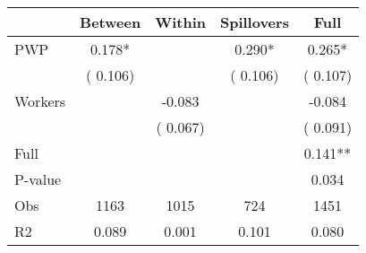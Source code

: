 
\begin{tabular}{l*{4}{c}}\hline&\multicolumn{1}{c}{Between}&\multicolumn{1}{c}{Within}&\multicolumn{1}{c}{Spillovers}&\multicolumn{1}{c}{Full}\\ \hline
 PWP           &              0.178*      &                                               &        0.290* &         0.265*                            \\ 
                               &        (       0.106)           &                                       &       (       0.106)     &      (       0.107)                                           \\ 
 Workers       &                                               &       -0.083    &                                &            -0.084                            \\ 
                               &                                               & (       0.067)                  &                                        &      (       0.091)                                           \\ 
\hline                                                                                                                                                                                                                                            
 Full                  &                                               &                                               &                                        &             0.141**                                     \\ 
 P-value               &                                               &                                               &                                        &             0.034                                           \\ 
 Obs                   &               1163               &       1015                       &       724                &              1451                                               \\ 
 R2                    &                      0.089              &              0.001                      &              0.101               &                     0.080                                              \\ 
\hline \end{tabular}                                                                                                                                                                                                              